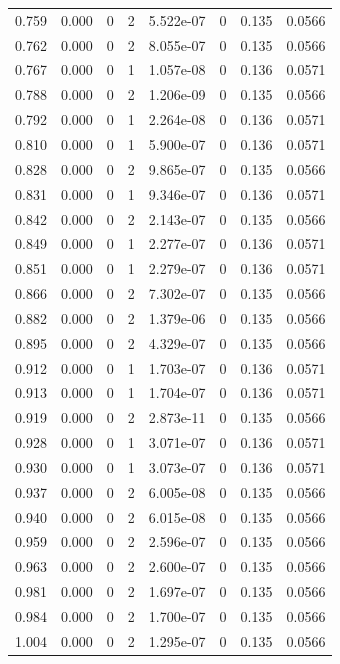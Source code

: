 \documentclass[preview]{standalone}
\begin{document}
{{{\begin{tabular}{L{1.2cm}C{1.2cm} C{0.3cm}C{0.5cm} C{1.4cm}C{1.4cm} C{1.4cm}C{1.4cm}}
  0.759  &  0.000  & 0     &  2 &  5.522e-07  & 0  & 0.135 &  0.0566   \\ 
  0.762  &  0.000  & 0     &  2 &  8.055e-07  & 0  & 0.135 &  0.0566   \\ 
  0.767  &  0.000  & 0     &  1 &  1.057e-08  & 0  & 0.136 &  0.0571   \\ 
  0.788  &  0.000  & 0     &  2 &  1.206e-09  & 0  & 0.135 &  0.0566   \\ 
  0.792  &  0.000  & 0     &  1 &  2.264e-08  & 0  & 0.136 &  0.0571   \\ 
  0.810  &  0.000  & 0     &  1 &  5.900e-07  & 0  & 0.136 &  0.0571   \\ 
  0.828  &  0.000  & 0     &  2 &  9.865e-07  & 0  & 0.135 &  0.0566   \\ 
  0.831  &  0.000  & 0     &  1 &  9.346e-07  & 0  & 0.136 &  0.0571   \\ 
  0.842  &  0.000  & 0     &  2 &  2.143e-07  & 0  & 0.135 &  0.0566   \\ 
  0.849  &  0.000  & 0     &  1 &  2.277e-07  & 0  & 0.136 &  0.0571   \\ 
  0.851  &  0.000  & 0     &  1 &  2.279e-07  & 0  & 0.136 &  0.0571   \\ 
  0.866  &  0.000  & 0     &  2 &  7.302e-07  & 0  & 0.135 &  0.0566   \\ 
  0.882  &  0.000  & 0     &  2 &  1.379e-06  & 0  & 0.135 &  0.0566   \\ 
  0.895  &  0.000  & 0     &  2 &  4.329e-07  & 0  & 0.135 &  0.0566   \\ 
  0.912  &  0.000  & 0     &  1 &  1.703e-07  & 0  & 0.136 &  0.0571   \\ 
  0.913  &  0.000  & 0     &  1 &  1.704e-07  & 0  & 0.136 &  0.0571   \\ 
  0.919  &  0.000  & 0     &  2 &  2.873e-11  & 0  & 0.135 &  0.0566   \\ 
  0.928  &  0.000  & 0     &  1 &  3.071e-07  & 0  & 0.136 &  0.0571   \\ 
  0.930  &  0.000  & 0     &  1 &  3.073e-07  & 0  & 0.136 &  0.0571   \\ 
  0.937  &  0.000  & 0     &  2 &  6.005e-08  & 0  & 0.135 &  0.0566   \\ 
  0.940  &  0.000  & 0     &  2 &  6.015e-08  & 0  & 0.135 &  0.0566   \\ 
  0.959  &  0.000  & 0     &  2 &  2.596e-07  & 0  & 0.135 &  0.0566   \\ 
  0.963  &  0.000  & 0     &  2 &  2.600e-07  & 0  & 0.135 &  0.0566   \\ 
  0.981  &  0.000  & 0     &  2 &  1.697e-07  & 0  & 0.135 &  0.0566   \\ 
  0.984  &  0.000  & 0     &  2 &  1.700e-07  & 0  & 0.135 &  0.0566   \\ 
  1.004  &  0.000  & 0     &  2 &  1.295e-07  & 0  & 0.135 &  0.0566   \\ 
\hline 
\end{tabular} 

}}}
\end{document}
